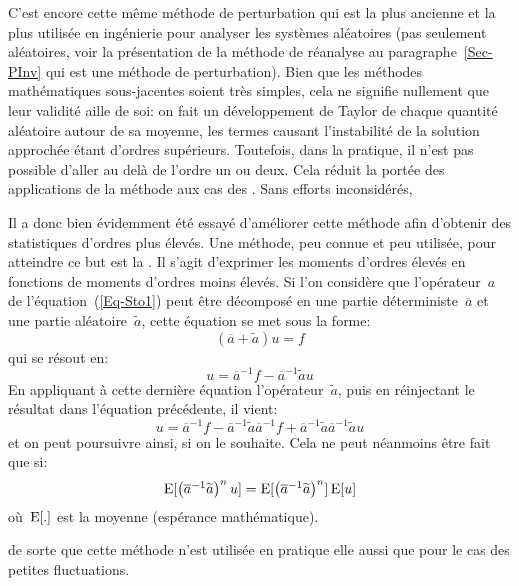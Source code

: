 \begin{histoire}
\medskip
C'est encore cette même méthode de perturbation qui est la plus ancienne et la plus utilisée en ingénierie pour analyser les systèmes aléatoires (pas seulement aléatoires, voir la présentation de la méthode de réanalyse au paragraphe~\ref{Sec-PInv} qui est une méthode de perturbation).
Bien que les méthodes mathématiques sous-jacentes soient très simples, cela ne signifie nullement que leur validité aille de soi: on fait un développement de Taylor de chaque quantité aléatoire autour de sa moyenne, les termes causant l'instabilité de la solution approchée étant d'ordres supérieurs. Toutefois, dans la pratique, il n'est pas possible d'aller au delà de l'ordre un ou deux. Cela réduit la portée des applications de la méthode aux cas des . Sans efforts inconsidérés, 

\medskip
Il a donc bien évidemment été essayé d'améliorer cette méthode afin d'obtenir des statistiques d'ordres plus élevés. Une méthode, peu connue et peu utilisée, pour atteindre ce but est la . Il s'agit d'exprimer les moments d'ordres élevés en fonctions de moments d'ordres moins élevés.
Si l'on considère que l'opérateur~$a$ de l'équation~(\ref{Eq-Sto1}) peut être décomposé en une partie déterministe~$\overline{a}$ et une partie aléatoire~$\widetilde{a}$, cette équation se met sous la forme:
\begin{equation}
(\overline{a}+\widetilde{a})u=f
\end{equation}
qui se résout en:
\begin{equation}
u=\overline{a}^{-1}f-\overline{a}^{-1}\widetilde{a}u
\end{equation}
En appliquant à cette dernière équation l'opérateur~$\widetilde{a}$, puis en réinjectant le résultat dans l'équation précédente, il vient:
\begin{equation}
u=\overline{a}^{-1}f-\overline{a}^{-1}\widetilde{a}\overline{a}^{-1}f+\overline{a}^{-1}\widetilde{a}\overline{a}^{-1}\widetilde{a}u
\end{equation}
et on peut poursuivre ainsi, si on le souhaite. Cela ne peut néanmoins être fait que si:
\begin{equation}\label{Eq-Unco}
\operatorname{E}[\begin{pmatrix}\overline{a}^{-1}\widetilde{a}\end{pmatrix}^nu] = \operatorname{E}[\begin{pmatrix}\overline{a}^{-1}\widetilde{a}\end{pmatrix}^n]\operatorname{E}[u]
\end{equation}
où~$\operatorname{E}[.]$ est la moyenne (espérance mathématique).

  de sorte que cette méthode n'est utilisée en pratique elle aussi que pour le cas des petites fluctuations.
\end{histoire}

